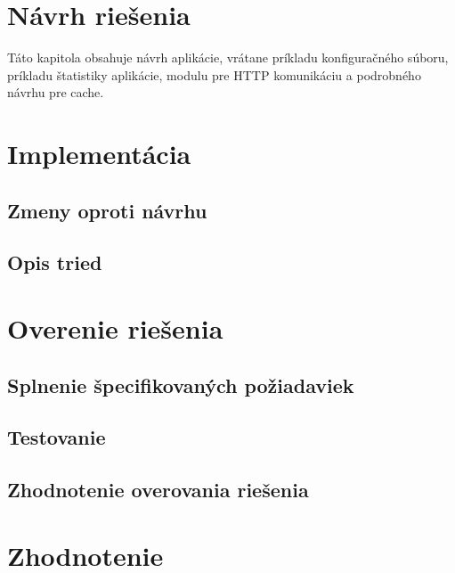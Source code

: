 \documentclass[12pt, twoside]{book}
\begin{document}
\section{Návrh riešenia}
Táto kapitola obsahuje návrh aplikácie, vrátane príkladu konfiguračného súboru, príkladu štatistiky aplikácie, modulu pre HTTP komunikáciu a podrobného návrhu pre cache.


\section{Implementácia}


\subsection{Zmeny oproti návrhu}


\subsection{Opis tried}


\section{Overenie riešenia}


\subsection{Splnenie špecifikovaných požiadaviek}



\subsection{Testovanie}


\subsection{Zhodnotenie overovania riešenia}



\section{Zhodnotenie}



\newpage\null\thispagestyle{empty}\newpage

\makeatletter
{}
\makeatother

{}
\end{document}
